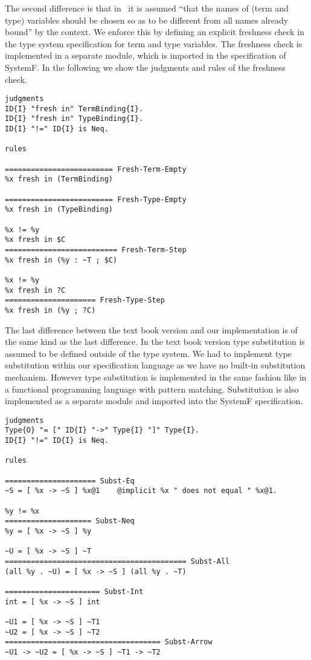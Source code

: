 The second difference is that in~\cite{Pierce:2002:TPL:509043} it is
assumed ``that the names of (term and type) variables should be chosen
so as to be different from all names already bound'' by the
context. We enforce this by defining an explicit freshness check in
the type system specification for term and type variables. The
freshness check is implemented in a separate module, which is imported
in the specification of SystemF. In the following we show the
judgments and rules of the freshness check.
\newpage
\begin{lstlisting}[language=sltc]
judgments 
ID{I} "fresh in" TermBinding{I}.
ID{I} "fresh in" TypeBinding{I}.
ID{I} "!=" ID{I} is Neq.

rules

========================= Fresh-Term-Empty
%x fresh in (TermBinding)

========================= Fresh-Type-Empty
%x fresh in (TypeBinding)

%x != %y
%x fresh in $C
========================== Fresh-Term-Step
%x fresh in (%y : ~T ; $C)

%x != %y
%x fresh in ?C
===================== Fresh-Type-Step
%x fresh in (%y ; ?C)
\end{lstlisting}

The last difference between the text book version and our
implementation is of the same kind as the last difference. In the text
book version type substitution is assumed to be defined outside of the
type system. We had to implement type substitution within our
specification language as we have no built-in substitution
mechanism. However type substitution is implemented in the same
fashion like in a functional programming language with pattern
matching. Substitution is also implemented as a separate module and
imported into the SystemF specification.

\begin{lstlisting}[language=sltc]
judgments
Type{O} "= [" ID{I} "->" Type{I} "]" Type{I}.
ID{I} "!=" ID{I} is Neq.

rules

===================== Subst-Eq
~S = [ %x -> ~S ] %x@1    @implicit %x " does not equal " %x@1.

%y != %x
==================== Subst-Neq
%y = [ %x -> ~S ] %y

~U = [ %x -> ~S ] ~T
========================================== Subst-All
(all %y . ~U) = [ %x -> ~S ] (all %y . ~T)

====================== Subst-Int
int = [ %x -> ~S ] int

~U1 = [ %x -> ~S ] ~T1
~U2 = [ %x -> ~S ] ~T2
==================================== Subst-Arrow
~U1 -> ~U2 = [ %x -> ~S ] ~T1 -> ~T2
\end{lstlisting}

